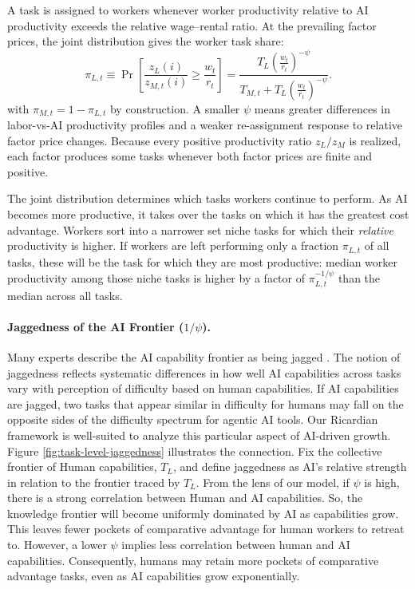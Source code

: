 \documentclass[11pt]{article}
\begin{document}
A task is assigned to workers whenever worker productivity relative
to AI productivity exceeds the relative wage--rental ratio. At the
prevailing factor prices, the joint distribution gives the worker
task share:
\begin{equation}
\pi_{L,t}\equiv\Pr\!\left[\frac{z_{L}(i)}{z_{M,t}(i)}\geq\frac{w_{t}}{r_{t}}\right]=\frac{T_{L}\left(\frac{w_{t}}{r_{t}}\right)^{-\psi}}{T_{M,t}+T_{L}\left(\frac{w_{t}}{r_{t}}\right)^{-\psi}}.\label{eq:assignment-probability}
\end{equation}
with $\pi_{M,t}=1-\pi_{L,t}$ by construction. A smaller $\psi$ means
greater differences in labor-vs-AI productivity profiles and a weaker
re-assignment response to relative factor price changes. Because every
positive productivity ratio $z_{L}/z_{M}$ is realized, each factor
produces some tasks whenever both factor prices are finite and positive.

The joint distribution determines which tasks workers continue to
perform. As AI becomes more productive, it takes over the tasks on
which it has the greatest cost advantage. Workers sort into a narrower
set niche tasks for which their \emph{relative} productivity is higher.
If workers are left performing only a fraction $\pi_{L,t}$ of all
tasks, these will be the task for which they are most productive:
median worker productivity among those niche tasks is higher by a
factor of $\pi^{-1/\psi}_{L,t}$ than the median across all tasks.

\paragraph{Jaggedness of the AI Frontier ($1/\psi$).}

Many experts describe the AI capability frontier as being jagged \citep{dellacqua2026}.
The notion of jaggedness reflects systematic differences in how well
AI capabilities across tasks vary with perception of difficulty based
on human capabilities. If AI capabilities are jagged, two tasks that
appear similar in difficulty for humans may fall on the opposite sides
of the difficulty spectrum for agentic AI tools. Our Ricardian framework
is well-suited to analyze this particular aspect of AI-driven growth.
Figure \ref{fig:task-level-jaggedness} illustrates the connection.
Fix the collective frontier of Human capabilities, $T_{L}$, and define
jaggedness as AI's relative strength in relation to the frontier traced
by $T_{L}$. From the lens of our model, if $\psi$ is high, there
is a strong correlation between Human and AI capabilities. So, the
knowledge frontier will become uniformly dominated by AI as capabilities
grow. This leaves fewer pockets of comparative advantage for human
workers to retreat to. However, a lower $\psi$ implies less correlation
between human and AI capabilities. Consequently, humans may retain
more pockets of comparative advantage tasks, even as AI capabilities
grow exponentially.
\end{document}
